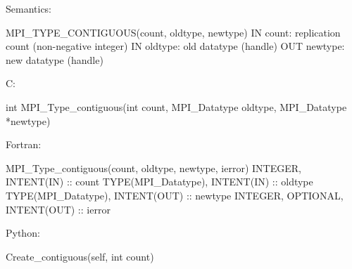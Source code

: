Semantics:

MPI_TYPE_CONTIGUOUS(count, oldtype, newtype)
IN count: replication count (non-negative integer)
IN oldtype: old datatype (handle)
OUT newtype: new datatype (handle)

C:

int MPI_Type_contiguous(int count, MPI_Datatype oldtype, MPI_Datatype *newtype)

Fortran:

MPI_Type_contiguous(count, oldtype, newtype, ierror)
INTEGER, INTENT(IN) :: count
TYPE(MPI_Datatype), INTENT(IN) :: oldtype
TYPE(MPI_Datatype), INTENT(OUT) :: newtype
INTEGER, OPTIONAL, INTENT(OUT) :: ierror

Python:

Create_contiguous(self, int count)
